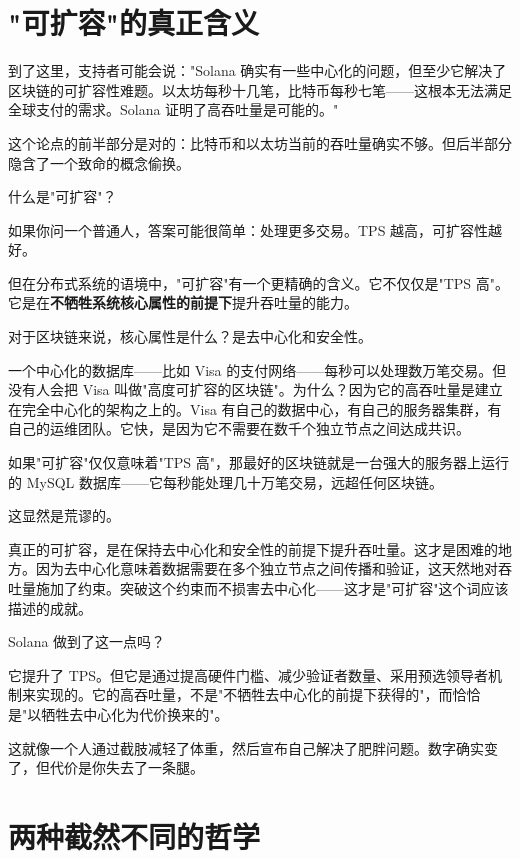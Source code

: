 \documentclass[a4paper,12pt,openany]{ctexbook}
\begin{document}
\section*{"可扩容"的真正含义}


到了这里，支持者可能会说："Solana 确实有一些中心化的问题，但至少它解决了区块链的可扩容性难题。以太坊每秒十几笔，比特币每秒七笔——这根本无法满足全球支付的需求。Solana 证明了高吞吐量是可能的。"

这个论点的前半部分是对的：比特币和以太坊当前的吞吐量确实不够。但后半部分隐含了一个致命的概念偷换。

什么是"可扩容"？

如果你问一个普通人，答案可能很简单：处理更多交易。TPS 越高，可扩容性越好。

但在分布式系统的语境中，"可扩容"有一个更精确的含义。它不仅仅是"TPS 高"。它是在\textbf{不牺牲系统核心属性的前提下}提升吞吐量的能力。

对于区块链来说，核心属性是什么？是去中心化和安全性。

一个中心化的数据库——比如 Visa 的支付网络——每秒可以处理数万笔交易。但没有人会把 Visa 叫做"高度可扩容的区块链"。为什么？因为它的高吞吐量是建立在完全中心化的架构之上的。Visa 有自己的数据中心，有自己的服务器集群，有自己的运维团队。它快，是因为它不需要在数千个独立节点之间达成共识。

如果"可扩容"仅仅意味着"TPS 高"，那最好的区块链就是一台强大的服务器上运行的 MySQL 数据库——它每秒能处理几十万笔交易，远超任何区块链。

这显然是荒谬的。

真正的可扩容，是在保持去中心化和安全性的前提下提升吞吐量。这才是困难的地方。因为去中心化意味着数据需要在多个独立节点之间传播和验证，这天然地对吞吐量施加了约束。突破这个约束而不损害去中心化——这才是"可扩容"这个词应该描述的成就。

Solana 做到了这一点吗？

它提升了 TPS。但它是通过提高硬件门槛、减少验证者数量、采用预选领导者机制来实现的。它的高吞吐量，不是"不牺牲去中心化的前提下获得的"，而恰恰是"以牺牲去中心化为代价换来的"。

这就像一个人通过截肢减轻了体重，然后宣布自己解决了肥胖问题。数字确实变了，但代价是你失去了一条腿。


\section*{两种截然不同的哲学}
\end{document}
